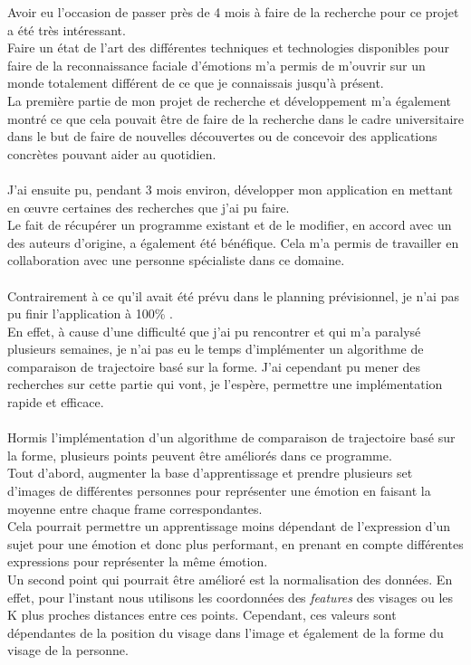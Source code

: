 \documentclass[poster]{polytech/polytech}
\begin{document}
Avoir eu l'occasion de passer près de 4 mois à faire de la recherche pour ce projet a été très intéressant.\\
Faire un état de l'art des différentes techniques et technologies disponibles pour faire de la reconnaissance faciale d'émotions m'a permis de m'ouvrir sur un monde totalement différent de ce que je connaissais jusqu'à présent.\\
La première partie de mon projet de recherche et développement m'a également montré ce que cela pouvait être de faire de la recherche dans le cadre universitaire dans le but de faire de nouvelles découvertes ou de concevoir des applications concrètes pouvant aider au quotidien.\\
\\
J'ai ensuite pu, pendant 3 mois environ, développer mon application en mettant en œuvre certaines des recherches que j'ai pu faire.\\
Le fait de récupérer un programme existant et de le modifier, en accord avec un des auteurs d'origine, a également été bénéfique. Cela m'a permis de travailler en collaboration avec une personne spécialiste dans ce domaine.\\
\\
Contrairement à ce qu'il avait été prévu dans le planning prévisionnel, je n'ai pas pu finir l'application à 100\% .\\
En effet, à cause d'une difficulté que j'ai pu rencontrer et qui m'a paralysé plusieurs semaines, je n'ai pas eu le temps d'implémenter un algorithme de comparaison de trajectoire basé sur la forme. J'ai cependant pu mener des recherches sur cette partie qui vont, je l'espère, permettre une implémentation rapide et efficace.\\
\\
Hormis l'implémentation d'un algorithme de comparaison de trajectoire basé sur la forme, plusieurs points peuvent être améliorés dans ce programme.\\
Tout d'abord, augmenter la base d'apprentissage et prendre plusieurs set d'images de différentes personnes pour représenter une émotion en faisant la moyenne entre chaque frame correspondantes.\\
Cela pourrait permettre un apprentissage moins dépendant de l'expression d'un sujet pour une émotion et donc plus performant, en prenant en compte différentes expressions pour représenter la même émotion.\\
Un second point qui pourrait être amélioré est la normalisation des données. En effet, pour l'instant nous utilisons les coordonnées des \textit{features} des visages ou les K plus proches distances entre ces points. Cependant, ces valeurs sont dépendantes de la position du visage dans l'image et également de la forme du visage de la personne.\\
\end{document}
